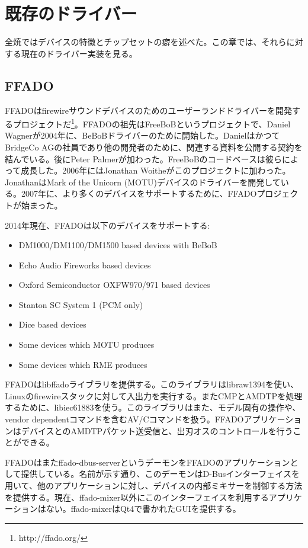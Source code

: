 \documentclass[onecolumn]{jarticle}
\begin{document}
\section{既存のドライバー}

全焼ではデバイスの特徴とチップセットの癖を述べた。この章では、それらに対する現在のドライバー実装を見る。

\subsection{FFADO}

FFADOはfirewireサウンドデバイスのためのユーザーランドドライバーを開発するプロジェクトだ\footnote{http://ffado.org/}。FFADOの祖先はFreeBoBというプロジェクトで、Daniel Wagnerが2004年に、BeBoBドライバーのために開始した。DanielはかつてBridgeCo AGの社員であり他の開発者のために、関連する資料を公開する契約を結んでいる。後にPeter Palmerが加わった。FreeBoBのコードベースは彼らによって成長した。2006年にはJonathan Woitheがこのプロジェクトに加わった。JonathanはMark of the Unicorn (MOTU)デバイスのドライバーを開発している。2007年に、より多くのデバイスをサポートするために、FFADOプロジェクトが始まった。

2014年現在、FFADOは以下のデバイスをサポートする:
\begin{itemize}
\item DM1000/DM1100/DM1500 based devices with BeBoB
\item Echo Audio Fireworks based devices
\item Oxford Semiconductor OXFW970/971 based devices
\item Stanton SC System 1 (PCM only)
\item Dice based devices
\item Some devices which MOTU produces
\item Some devices which RME produces
\end{itemize}

FFADOはlibffadoライブラリを提供する。このライブラリはlibraw1394を使い、Linuxのfirewireスタックに対して入出力を実行する。またCMPとAMDTPを処理するために、libiec61883を使う。このライブラリはまた、モデル固有の操作や、vendor dependentコマンドを含むAV/Cコマンドを扱う。FFADOアプリケーションはデバイスとのAMDTPパケット送受信と、出刃オスのコントロールを行うことができる。

FFADOはまたffado-dbus-serverというデーモンをFFADOのアプリケーションとして提供している。名前が示す通り、このデーモンはD-Busインターフェイスを用いて、他のアプリケーションに対し、デバイスの内部ミキサーを制御する方法を提供する。現在、ffado-mixer以外にこのインターフェイスを利用するアプリケーションはない。ffado-mixerはQt4で書かれたGUIを提供する。
\end{document}
